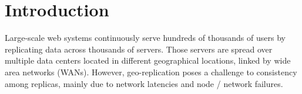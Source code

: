 \documentclass[doublespacing]{bmcart}
\begin{document}
\begin{frontmatter}
\begin{abstractbox}

\begin{keyword}
\end{keyword}


\end{abstractbox}
%

\end{frontmatter}



\section{Introduction}

Large-scale web systems continuously serve hundreds of thousands of users by
replicating data across thousands of servers. Those servers are spread over
multiple data centers located in different geographical locations, linked by
wide area networks (WANs). However, geo-replication poses a challenge to
consistency among replicas, mainly due to network latencies and
node / network failures.
\end{document}
